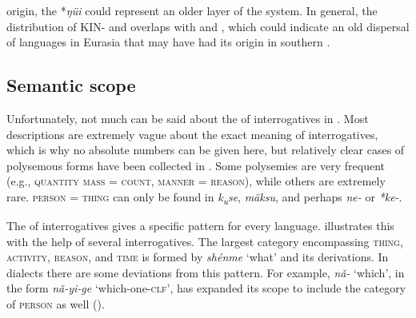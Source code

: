 origin, the  *\textit{ŋüi} could represent an older layer of the  system. In general, the distribution of KIN- and  overlaps with  and , which could indicate an old dispersal of languages in Eurasia that may have had its origin in southern  \citep{Nichols2010}.

\subsection{Semantic scope}

Unfortunately, not much can be said about the  of interrogatives in . Most descriptions are extremely vague about the exact meaning of interrogatives, which is why no absolute numbers can be given here, but relatively clear cases of polysemous forms have been collected in . Some polysemies are very frequent (e.g., \textsc{quantity mass = count}, \textsc{manner = reason}), while others are extremely rare. \textsc{person = thing} can only be found in  \textit{k\textsubscript{u}}\textit{se}, \textit{mäksu}, and perhaps  \textit{ne-} or  \textit{*ke{}-}.

The  of interrogatives gives a specific pattern for every language.  illustrates this with the help of several  interrogatives. The largest category encompassing \textsc{thing}, \textsc{activity}, \textsc{reason}, and \textsc{time} is formed by \textit{shénme} ‘what’ and its derivations. In  dialects there are some deviations from this pattern. For example, \textit{nǎ-} ‘which’, in the form \textit{nǎ-yi-ge} ‘which-one-\textsc{clf}’, has expanded its scope to include the category of \textsc{person} as well ().

